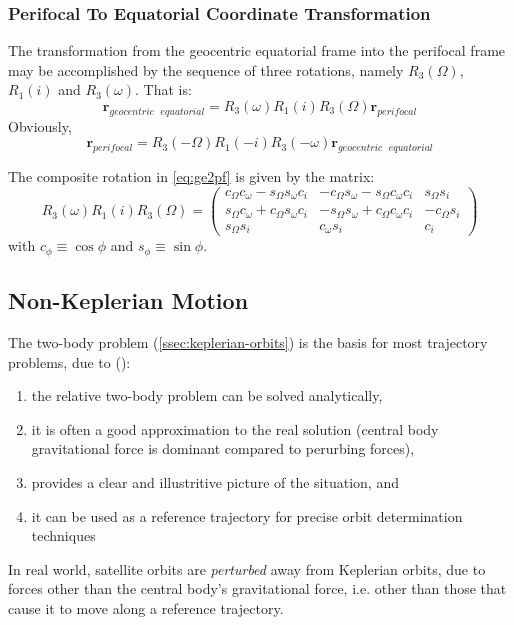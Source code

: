 \subsubsection{Perifocal To Equatorial Coordinate Transformation}
The transformation from the geocentric equatorial frame into the perifocal frame
may be accomplished by the sequence of three rotations, namely $R_3(\Omega)$,
$R_1(i)$ and $R_3(\omega)$. That is:
\begin{equation}
  \label{eq:ge2pf}
  \bm{r}_{geocentric\text{ }equatorial} = R_3(\omega)  R_1(i)  R_3(\Omega) \bm{r}_{perifocal}
\end{equation}
Obviously, 
\begin{equation}
  \bm{r}_{perifocal} = R_3(-\Omega)  R_1(-i)  R_3(-\omega) \bm{r}_{geocentric\text{ }equatorial}
\end{equation}

The composite rotation in \ref{eq:ge2pf} is given by the matrix:
\begin{equation}
  R_3(\omega)  R_1(i)  R_3(\Omega) = 
  \begin{pmatrix}
    c_{\Omega} c_{\omega} - s_{\Omega} s_{\omega} c_{i} & 
      -c_{\Omega} s_{\omega} - s_{\Omega} c_{\omega} c_{i} &
      s_{\Omega} s_{i} \\
    s_{\Omega} c_{\omega} + c_{\Omega} s_{\omega} c_{i} &
      -s_{\Omega} s_{\omega} + c_{\Omega} c_{\omega} c_{i} &
      -c_{\Omega} s_{i} \\
    s_{\Omega} s_{i}                                    &
      c_{\omega} s_{i}                                  &
      c_{i}
  \end{pmatrix}
\end{equation}
with $c_{\phi} \equiv \cos \phi$ and $s_{\phi} \equiv \sin \phi$.

\subsection{Non-Keplerian Motion}
\label{ssec:non-keplerian}
The two-body problem (\ref{ssec:keplerian-orbits}) is the basis for most 
trajectory problems, due to (\cite{hintz}):
\begin{enumerate}
  \item the relative two-body problem can be solved analytically,
  \item it is often a good approximation to the real solution (central body 
    gravitational force is dominant compared to perurbing forces),
  \item provides a clear and illustritive picture of the situation, and
  \item it can be used as a reference trajectory for precise orbit 
    determination techniques
\end{enumerate}
In real world, satellite orbits are \emph{perturbed} away from Keplerian 
orbits, due to forces other than the central body's gravitational force, i.e. 
other than those that cause it to move along a reference trajectory.

